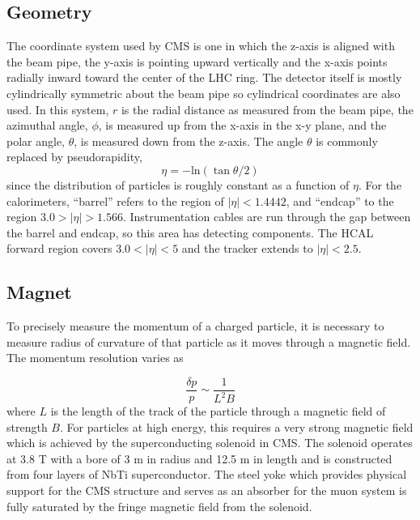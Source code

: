  \subsection{Geometry} 
The coordinate system used by CMS is one in
 which the z-axis is aligned with the beam pipe,
 the y-axis is pointing upward vertically
 and the x-axis points radially inward toward the
 center of the LHC ring. 
The detector itself is mostly cylindrically symmetric
 about the beam pipe so cylindrical coordinates
 are also used.
In this system, $r$ is the radial distance
 as measured from the beam pipe, the azimuthal angle, $\phi$,
 is measured up from the x-axis in the x-y plane,
 and the polar angle, $\theta$, is measured
 down from the z-axis.
The angle $\theta$ is commonly replaced by pseudorapidity, 
\begin{equation}\label{eq:eta}
\eta = -\mathrm{ln}(\tan \theta/2)
\end{equation}
 since the distribution of particles
 is roughly constant as a function of $\eta$.
For the calorimeters, “barrel” refers to the region of $|\eta| < 1.4442$,
 and “endcap” to the region $3.0 > |\eta| > 1.566$.
Instrumentation cables are run through the
 gap between the barrel and endcap,
 so this area has detecting components. 
The HCAL forward region covers $3.0 < |\eta| < 5$ and
 the tracker extends to $|\eta| < 2.5$.

 \subsection{Magnet}
To precisely measure the momentum of a charged particle, 
 it is necessary to measure radius of curvature 
 of that particle as it moves through a magnetic field.
The momentum resolution varies as 

\begin{equation}\label{eq:res_mag}
\frac{\delta p}{p} \sim \frac{1}{L^2B}
\end{equation}
 where $L$ is the length of the track of the 
 particle through a magnetic field of
 strength $B$.
For particles at high energy, this requires a very strong
 magnetic field which is achieved by the superconducting 
 solenoid in CMS.
The solenoid operates at 3.8 T with 
 a bore of 3 m in radius and 12.5 m in length
 and is constructed from four layers of NbTi superconductor.
The steel yoke which provides physical support for the 
 CMS structure and serves as an absorber for the
 muon system is fully saturated by the fringe magnetic field
 from the solenoid.

